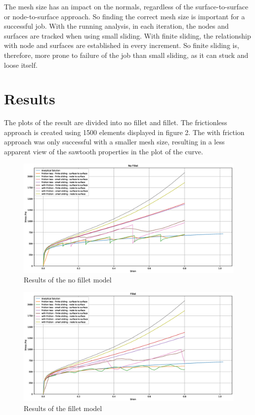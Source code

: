 \documentclass[12pt]{article}
\begin{document}
The mesh size has an impact on the normals, regardless of the surface-to-surface or node-to-surface approach. So finding the correct mesh size is important for a successful job. With the running analysis, in each iteration, the nodes and surfaces are tracked when using small sliding. With finite sliding, the relationship with node and surfaces are established in every increment. So finite sliding is, therefore, more prone to failure of the job than small sliding, as it can stuck and loose itself.
\newpage

\section{Results}
The plots of the result are divided into no fillet and fillet. The frictionless approach is created using 1500 elements displayed in figure 2. The with friction approach was only successful with a smaller mesh size, resulting in a less apparent view of the sawtooth properties in the plot of the curve.
\begin{figure}[!htb]
  \centering
  \includegraphics[trim={4cm 1cm 4cm 1.8cm},clip,width=0.9\linewidth]{pics/no_fillet}
  \caption{Results of the no fillet model}
  \label{fig:3}
\end{figure}

\begin{figure}[!htb]
  \centering
  \includegraphics[trim={4cm 1cm 4cm 1.8cm},clip,width=0.9\linewidth]{pics/fillet}
  \caption{Results of the fillet model}
  \label{fig:4}
\end{figure}
\end{document}
